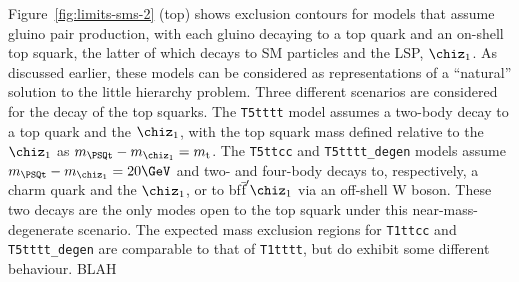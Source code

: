 Figure~\ref{fig:limits-sms-2} (top) shows exclusion contours for
models that assume gluino pair production, with each gluino decaying
to a top quark and an on-shell top squark, the latter of which decays
to SM particles and the LSP, $\chiz_1$. As discussed earlier, these
models can be considered as representations of a ``natural'' solution
to the little hierarchy problem. Three different scenarios are
considered for the decay of the top squarks. The \texttt{T5tttt} model
assumes a two-body decay to a top quark and the $\chiz_1$, with the
top squark mass defined relative to the $\chiz_1$ as $m_{\PSQt} -
m_{\chiz_1} = m_\text{t}$. The \texttt{T5ttcc} and
\texttt{T5tttt\_degen} models assume $m_{\PSQt} - m_{\chiz_1} =
20\GeV$ and two- and four-body decays to, respectively, a charm quark
and the $\chiz_1$, or to bf$\bar{\text{f}}'\chiz_1$ via an off-shell W
boson. These two decays are the only modes open to the top squark
under this near-mass-degenerate scenario.
The expected mass exclusion regions for \texttt{T1ttcc} and
\texttt{T5tttt\_degen} are comparable to that of \texttt{T1tttt}, but
do exhibit some different behaviour. BLAH

